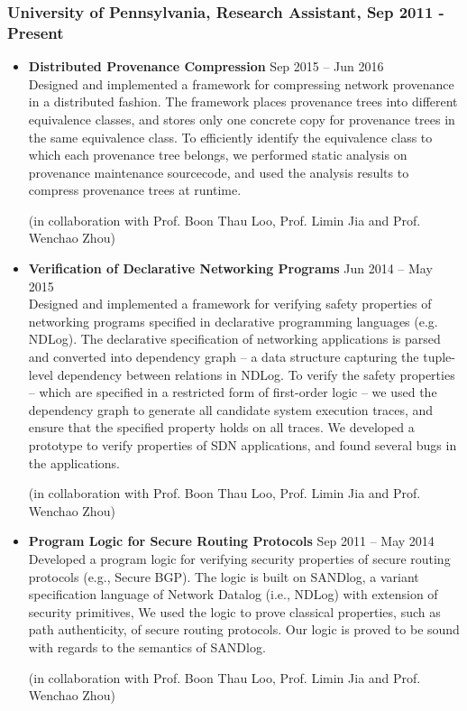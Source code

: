 \vspace{8pt} %

\subsubsection{University of Pennsylvania, Research Assistant, Sep 2011 - Present}
\begin{itemize}
\item {\bf Distributed Provenance Compression} \hfill Sep 2015 -- Jun
  2016\\ Designed and implemented a framework for compressing network
  provenance in a distributed fashion. The framework places provenance
  trees into different equivalence classes, and stores only one
  concrete copy for provenance trees in the same equivalence class. To
  efficiently identify the equivalence class to which each provenance tree
  belongs, we performed static analysis on provenance maintenance
  sourcecode, and used the analysis results to compress provenance
  trees at runtime.


(in collaboration with Prof. Boon Thau Loo, Prof. Limin Jia and Prof. Wenchao Zhou)
\item {\bf Verification of Declarative Networking Programs} \hfill Jun
  2014 -- May 2015\\ Designed and implemented a framework for
  verifying safety properties of networking programs specified in
  declarative programming languages (e.g. NDLog). The declarative
  specification of networking applications is parsed and converted
  into dependency graph -- a data structure capturing the tuple-level
  dependency between relations in NDLog. To verify the safety
  properties -- which are specified in a restricted form of
  first-order logic -- we used the dependency graph to generate all
  candidate system execution traces, and ensure that the specified
  property holds on all traces. We developed a prototype to verify
  properties of SDN applications, and found several bugs in the
  applications.


(in collaboration with Prof. Boon Thau Loo, Prof. Limin Jia and Prof. Wenchao Zhou)
\item {\bf Program Logic for Secure Routing Protocols} \hfill Sep 2011
  -- May 2014\\ Developed a program logic for verifying security
  properties of secure routing protocols (e.g., Secure BGP). The logic
  is built on SANDlog, a variant specification language of Network
  Datalog (i.e., NDLog) with extension of security primitives, We used
  the logic to prove classical properties, such as path authenticity,
  of secure routing protocols. Our logic is proved to be sound with
  regards to the semantics of SANDlog.


(in collaboration with Prof. Boon Thau Loo, Prof. Limin Jia and Prof. Wenchao Zhou)
\end{itemize}
